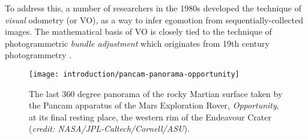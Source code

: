 To address this, a number of researchers in the 1980s developed the technique of \textit{visual} odometry \citep{Scaramuzza2011-qr} (or VO), as a way to infer egomotion from sequentially-collected images. The mathematical basis of VO is closely tied to the technique of photogrammetric \textit{bundle adjustment} \citep{triggs_bundle_2000} which originates from 19th century photogrammetry \citep{albertz_look_2007}.



% 
\begin{figure}
  \begin{center}
    \texttt{[image: introduction/pancam-panorama-opportunity]}
  \end{center}
  \caption{The last 360 degree panorama of the rocky Martian surface taken by the Pancam apparatus of the Mars Exploration Rover, \textit{Opportunity}, at its final resting place, the western rim of the Endeavour Crater (\textit{credit: NASA/JPL-Caltech/Cornell/ASU}).}
    \label{fig:intro_endeavour_crater}
\end{figure}







